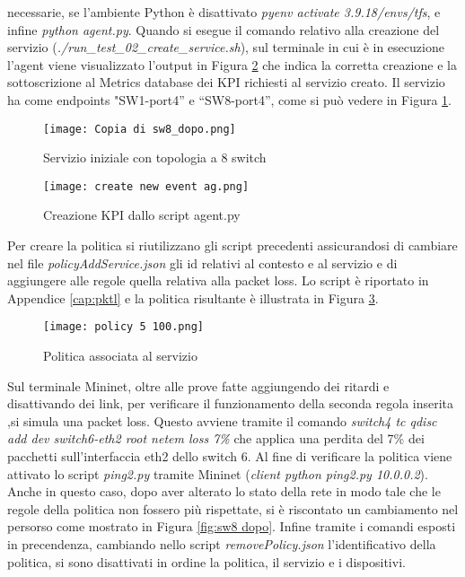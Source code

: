 necessarie, se l'ambiente Python è disattivato \textit{pyenv activate 3.9.18/envs/tfs}, e infine \textit{python agent.py}.
Quando si esegue il comando relativo alla creazione del servizio (\textit{./run\_test\_02\_create\_service.sh}),
sul terminale in cui è in esecuzione l'agent viene visualizzato l'output in Figura \ref{fig:ag} che indica la corretta creazione e la sottoscrizione al
Metrics database dei KPI richiesti al servizio creato.
\newline Il servizio ha come endpoints "SW1-port4” e “SW8-port4”, come si può vedere in Figura \ref{fig:sw8}.
\begin{figure}[h]
    \centering
   \texttt{[image: Copia di sw8\_dopo.png]}
    \caption{Servizio iniziale con topologia a 8 switch}
    \label{fig:sw8}
\end{figure}
\begin{figure}[h]
    \centering
   \texttt{[image: create new event ag.png]}
    \caption{Creazione KPI dallo script agent.py}
    \label{fig:ag}
\end{figure}
\newline Per creare la politica si riutilizzano gli script precedenti assicurandosi di cambiare nel file \textit{policyAddService.json}
gli id relativi al contesto e al servizio e di aggiungere alle regole quella relativa alla packet loss. Lo script è riportato in Appendice \ref{cap:pktl} e
la politica risultante è illustrata in Figura \ref{fig:policy}.
\begin{figure}[h]
    \centering
   \texttt{[image: policy 5 100.png]}
    \caption{Politica associata al servizio}
    \label{fig:policy}
\end{figure}
\newline Sul terminale Mininet, oltre alle prove fatte aggiungendo dei ritardi e disattivando dei link, 
per verificare il funzionamento della seconda regola inserita ,si simula una packet loss.
Questo avviene tramite il comando
\textit{switch4 tc qdisc add dev switch6-eth2 root netem loss 7\%}
che applica una perdita del 7\% dei pacchetti sull'interfaccia eth2 dello switch 6.
Al fine di verificare la politica viene attivato lo script \textit{ping2.py} tramite Mininet
(\textit{client python ping2.py 10.0.0.2}).
Anche in questo caso, dopo aver alterato lo stato della rete in modo tale che le regole della politica non fossero più rispettate,
si è riscontato un cambiamento nel persorso come mostrato in Figura \ref{fig:sw8 dopo}.
Infine tramite i comandi esposti in precendenza, cambiando nello script \textit{removePolicy.json} l'identificativo della politica, si sono disattivati in ordine la politica, il servizio e i dispositivi.
